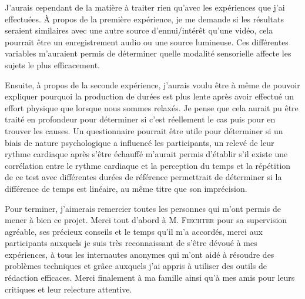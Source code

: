 \documentclass[12pt,fleqn,oneside,french,openany]{book} %
\begin{document}
J'aurais cependant de la matière à traiter rien qu'avec les expériences que j'ai effectuées. À propos de la première expérience, je me demande si les résultats seraient similaires avec une autre source d'ennui/intérêt qu'une vidéo, cela pourrait être un enregistrement audio ou une source lumineuse. Ces différentes variables m'auraient permis de déterminer quelle modalité sensorielle affecte les sujets le plus efficacement. 

Ensuite, à propos de la seconde expérience, j'aurais voulu être à même de pouvoir expliquer pourquoi la production de durées est plus lente après avoir effectué un effort physique que lorsque nous sommes relaxés. Je pense que cela aurait pu être traité en profondeur pour déterminer si c'est réellement le cas puis pour en trouver les causes. Un questionnaire pourrait être utile pour déterminer si un biais de nature psychologique a influencé les participants, un relevé de leur rythme cardiaque après s'être échauffé m'aurait permis d'établir s'il existe une corrélation entre le rythme cardiaque et la perception du temps et la répétition de ce test avec différentes durées de référence permettrait de déterminer si la différence de temps est linéaire, au même titre que son imprécision. 

Pour terminer, j'aimerais remercier toutes les personnes qui m'ont permis de mener à bien ce projet. Merci tout d'abord à M. \textsc{Fiechter} pour sa supervision agréable, ses précieux conseils et le temps qu'il m'a accordés, merci aux participants auxquels je suis très reconnaissant de s'être dévoué à mes expériences, à tous les internautes anonymes qui m'ont aidé à résoudre des problèmes techniques et grâce auxquels j'ai appris à utiliser des outils de rédaction efficaces. Merci finalement à ma famille ainsi qu'à mes amis pour leurs critiques et leur relecture attentive.

\vfill
\begin{figure}[b] 
\end{figure}




\end{document}
